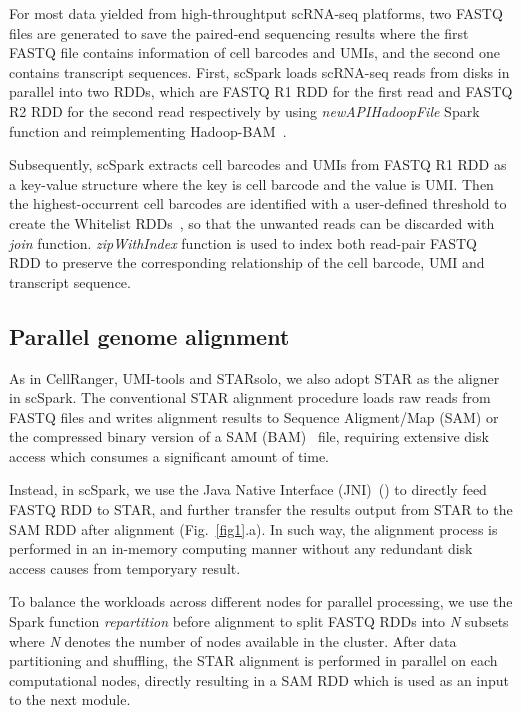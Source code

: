 \documentclass[conference]{IEEEtran}
\begin{document}
For most data yielded from high-throughtput scRNA-seq platforms, two FASTQ~\cite{cock2010sanger} files are generated to save the paired-end sequencing results where the first FASTQ file contains information of cell barcodes and UMIs, and the second one contains transcript sequences.
First, scSpark loads scRNA-seq reads from disks in parallel into two RDDs, which are FASTQ R1 RDD for the first read and FASTQ R2 RDD for the second read respectively by using \textit{newAPIHadoopFile} Spark function and reimplementing Hadoop-BAM~\cite{hadoopBAM}.

Subsequently, scSpark extracts cell barcodes and UMIs from FASTQ R1 RDD as a key-value structure where the key is cell barcode and the value is UMI. Then the highest-occurrent cell barcodes are identified with a user-defined threshold to create the Whitelist RDDs~\cite{guo2018bioinformatics}, so that the unwanted reads can be discarded with \textit{join} function. \textit{zipWithIndex} function is used to index both read-pair FASTQ RDD to preserve the corresponding relationship of the cell barcode, UMI and transcript sequence.

\subsection{Parallel genome alignment}

As in CellRanger, UMI-tools and STARsolo, we also adopt STAR as the aligner in scSpark.
The conventional STAR alignment procedure loads raw reads from FASTQ files and writes alignment results to Sequence Aligment/Map (SAM) or the compressed binary version of a SAM (BAM)~\cite{li2009sequence} file, requiring extensive disk access which consumes a significant amount of time.

Instead, in scSpark, we use the Java Native Interface (JNI)~(\cite{kim2012benchmarking}) to directly feed FASTQ RDD to STAR, and further transfer the results output from STAR to the SAM RDD after alignment (Fig.~\ref{fig1}.a). 
In such way, the alignment process is performed in an in-memory computing manner without any redundant disk access causes from temporyary result. 

To balance the workloads across different nodes for parallel processing, we use the Spark function \textit{repartition} before alignment to split FASTQ RDDs into \textit{N} subsets where \textit{N} denotes the number of nodes available in the cluster.
After data partitioning and shuffling, the STAR alignment is performed in parallel on each computational nodes, directly resulting in a SAM RDD which is used as an input to the next module.
\end{document}

